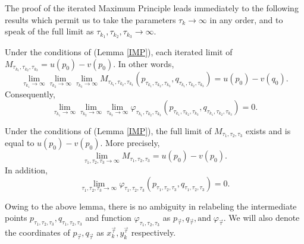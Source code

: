 \documentclass[reqno]{amsart}
\begin{document}
The proof of the iterated Maximum Principle leads immediately to the following results which permit us to take the parameters $\tau_k\to\infty$ in any order, and to speak of the full limit as $\tau_{k_1},\tau_{k_2},\tau_{k_3}\to\infty$.
\begin{corollary}\cite[Corollary 4.4]{B:GS} Under the conditions of (Lemma \ref{IMP}), each iterated limit of $M_{\tau_{k_1},\tau_{k_2},\tau_{k_3}}=u(p_0)-v(p_0)$. In other words, 
\[\lim_{\tau_{k_1}\to\infty}\lim_{\tau_{k_2}\to\infty}\lim_{\tau_{k_3}\to\infty}M_{\tau_{k_1},\tau_{k_2},\tau_{k_3}}(p_{\tau_{k_1},\tau_{k_2},\tau_{k_3}},q_{\tau_{k_1},\tau_{k_2},\tau_{k_3}})=u(p_0)-v(q_0).\]
Consequently,
\[\lim_{\tau_{k_1}\to\infty}\lim_{\tau_{k_2}\to\infty}\lim_{\tau_{k_3}\to\infty}\varphi_{\tau_{k_1},\tau_{k_2},\tau_{k_3}}(p_{\tau_{k_1},\tau_{k_2},\tau_{k_3}},q_{\tau_{k_1},\tau_{k_2},\tau_{k_3}})=0.\]
\end{corollary}
\begin{lemma}\cite[Lemma 4.5]{B:GS}
Under the conditions of (Lemma \ref{IMP}), the full limit of $M_{\tau_1,\tau_2,\tau_3}$ exists and is equal to $u(p_0)-v(p_0)$. More precisely,
\[\lim_{\tau_{1},\tau_{2},\tau_{3}\to\infty}M_{\tau_{1},\tau_{2},\tau_{3}}=u(p_0)-v(p_0).\]
In addition,
\[\lim_{\tau_1,\tau_2,\tau_3\to\infty}\varphi_{\tau_1,\tau_2,\tau_3}(p_{\tau_1,\tau_2,\tau_3},q_{\tau_1,\tau_2,\tau_3})=0.\]
\end{lemma}
\begin{remark}
Owing to the above lemma, there is no ambiguity in relabeling the intermediate points $p_{\tau_1,\tau_2,\tau_3},q_{\tau_1,\tau_2,\tau_3}$ and function $\varphi_{\tau_1,\tau_2,\tau_3}$ as $p_{\vec{\tau}},q_{\vec{\tau}},\text{and}\;\varphi_{\vec{\tau}}.$ We will also denote the coordinates of $p_{\vec{\tau}},q_{\vec{\tau}}$ as $x_k^{\vec{\tau}},y_k^{\vec{\tau}}$ respectively.
\end{remark}
\end{document}
